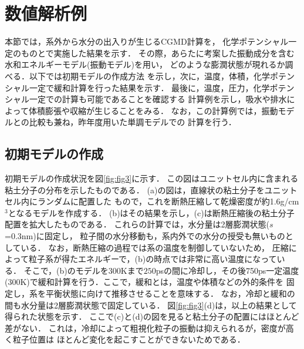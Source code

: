 \section{数値解析例}
本節では，系外から水分の出入りが生じるCGMD計算を，
化学ポテンシャル一定のものとで実施した結果を示す．
その際，あらたに考案した振動成分を含む水和エネルギーモデル(振動モデル)を用い，
どのような膨潤状態が現れるか調べる．以下では初期モデルの作成方法
を示し，次に，温度，体積，化学ポテンシャル一定で緩和計算を行った結果を示す．
最後に，温度，圧力，化学ポテンシャル一定での計算も可能であることを確認する
計算例を示し，吸水や排水によって体積膨張や収縮が生じることをみる．
なお，この計算例では，振動モデルとの比較も兼ね，昨年度用いた単調モデルでの
計算を行う．
\subsection{初期モデルの作成}
初期モデルの作成状況を図\ref{fig:fig3}に示す．
この図はユニットセル内に含まれる粘土分子の分布を示したものである．
(a)の図は，直線状の粘土分子をユニットセル内にランダムに配置した
もので，これを断熱圧縮して乾燥密度が約1.6g/cm$^{3}$となるモデルを作成する．
(b)はその結果を示し，(c)は断熱圧縮後の粘土分子配置を拡大したものである．
これらの計算では，水分量は2層膨潤状態($s$=0.3nm)に固定し，
粒子間の水分移動も，系内外での水分の授受も無いものとしている．
なお，断熱圧縮の過程では系の温度を制御していないため，
圧縮によって粒子系が得たエネルギーで，(b)の時点では非常に高い温度になっている．
そこで，(b)のモデルを300Kまで$250$psの間に冷却し，その後750ps一定温度
(300K)で緩和計算を行う．ここで，緩和とは，温度や体積などの外的条件を
固定し，系を平衡状態に向けて推移させることを意味する．
なお，冷却と緩和の間も水分量は2層膨潤状態で固定している．
図\ref{fig:fig3}(d)は，以上の結果として得られた状態を示す．
ここで(c)と(d)の図を見ると粘土分子の配置にはほとんど差がない．
これは，冷却によって粗視化粒子の振動は抑えられるが，密度が高く粒子位置は
ほとんど変化を起こすことができないためである．
